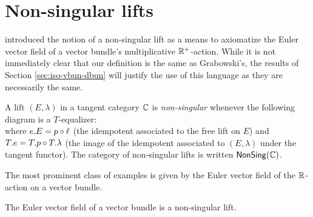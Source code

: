 
\section{Non-singular lifts}%
\label{sec:non-singular-lifts}
\cite{Grabowski2009} introduced the notion of a non-singular lift as a means to axiomatize the Euler vector field of a vector bundle's multiplicative $\mathbb{R}^+$-action. While it is not immediately clear that our definition is the same as Grabowski's, the results of Section \ref{sec:iso-vbun-dbun} will justify the use of this language as they are necessarily the same.
\begin{definition}%
  \label{def:non-singular-lift}
  A lift $(E,\lambda)$ in a tangent category $\mathbb{C}$ is \emph{non-singular} whenever the following diagram is a $T$-equalizer:
  \[
    
  \]
  where $e.E = p \circ \ell$ (the idempotent associated to the free lift on $E$) and $T.e = T.p \circ T.\lambda$ (the image of the idempotent associated to $(E,\lambda)$ under the tangent functor). The category of non-singular lifts is written $\mathsf{NonSing}(\mathbb{C})$.
\end{definition}
The most prominent class of examples is given by the Euler vector field of the $\mathbb{R}$-action on a vector bundle.
\begin{proposition}%
  \label{prop:evf-vbun-is-nonsingular}
  The Euler vector field of a vector bundle is a non-singular lift.
\end{proposition}
